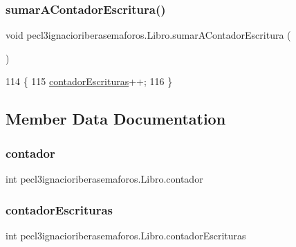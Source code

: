 \subsubsection{\texorpdfstring{sumar\+A\+Contador\+Escritura()}{sumarAContadorEscritura()}}
{\footnotesize\ttfamily void pecl3ignacioriberasemaforos.\+Libro.\+sumar\+A\+Contador\+Escritura (\begin{DoxyParamCaption}{ }\end{DoxyParamCaption})\hspace{0.3cm}{\ttfamily [inline]}}


\begin{DoxyCode}
114     \{
115         \mbox{\hyperlink{classpecl3ignacioriberasemaforos_1_1_libro_a94d54e5e2f7b6bb396e9eaa6799fdbe9}{contadorEscrituras}}++;
116     \}
\end{DoxyCode}


\subsection{Member Data Documentation}
\mbox{\label{classpecl3ignacioriberasemaforos_1_1_libro_a3e40890fd6a99fd333cc76188bf0841b}} 
\subsubsection{\texorpdfstring{contador}{contador}}
{\footnotesize\ttfamily int pecl3ignacioriberasemaforos.\+Libro.\+contador\hspace{0.3cm}{\ttfamily [private]}}

\mbox{\label{classpecl3ignacioriberasemaforos_1_1_libro_a94d54e5e2f7b6bb396e9eaa6799fdbe9}} 
\subsubsection{\texorpdfstring{contador\+Escrituras}{contadorEscrituras}}
{\footnotesize\ttfamily int pecl3ignacioriberasemaforos.\+Libro.\+contador\+Escrituras\hspace{0.3cm}{\ttfamily [private]}}

